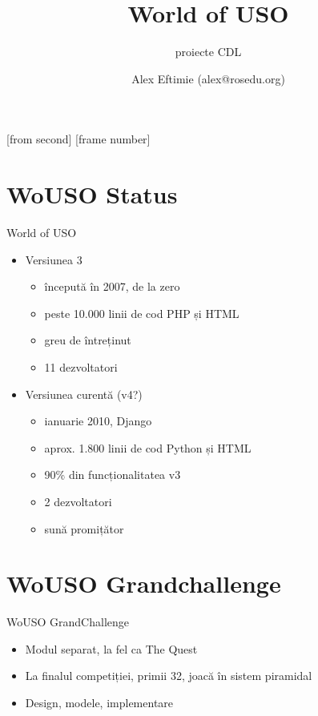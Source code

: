 \documentclass{beamer}
\title[WoUSO]{World of USO}
\subtitle{proiecte CDL}
\institute[ROSEdu]{ROSEdu}
\author[alex3f]{Alex Eftimie (alex@rosedu.org)}
\begin{document}
[from second]
[frame number]

\frame{\titlepage}

\section{WoUSO Status}


\begin{frame}{World of USO}
\begin{itemize}
	\item Versiunea 3
	\begin{itemize}
	\item începută în 2007, de la zero
	\item peste 10.000 linii de cod PHP și HTML
	\item greu de întreținut
	\item 11 dezvoltatori
	\end{itemize}
	\pause
	\item Versiunea curentă (v4?)
	\begin{itemize}
	\item ianuarie 2010, Django
	\item aprox. 1.800 linii de cod Python și HTML
	\item 90\% din funcționalitatea v3
	\item 2 dezvoltatori
	\item sună promițător
	\end{itemize}
\end{itemize}
\end{frame}

\section{WoUSO Grandchallenge}

\begin{frame}{WoUSO GrandChallenge}
  \begin{itemize}
    \item Modul separat, la fel ca The Quest
    \item La finalul competiției, primii 32, joacă în sistem piramidal
    \item Design, modele, implementare
  \end{itemize}
\end{frame}
\end{document}
